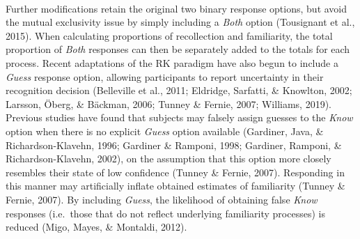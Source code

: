 \documentclass[
  11pt,
]{article}
\begin{document}
~

Further modifications retain the original two binary response options,
but avoid the mutual exclusivity issue by simply including a \emph{Both}
option (Tousignant et al., 2015). When calculating proportions of
recollection and familiarity, the total proportion of \emph{Both}
responses can then be separately added to the totals for each process.
Recent adaptations of the RK paradigm have also begun to include a
\emph{Guess} response option, allowing participants to report
uncertainty in their recognition decision (Belleville et al., 2011;
Eldridge, Sarfatti, \& Knowlton, 2002; Larsson, Öberg, \& Bäckman, 2006;
Tunney \& Fernie, 2007; Williams, 2019). Previous studies have found
that subjects may falsely assign guesses to the \emph{Know} option when
there is no explicit \emph{Guess} option available (Gardiner, Java, \&
Richardson-Klavehn, 1996; Gardiner \& Ramponi, 1998; Gardiner, Ramponi,
\& Richardson-Klavehn, 2002), on the assumption that this option more
closely resembles their state of low confidence (Tunney \& Fernie,
2007). Responding in this manner may artificially inflate obtained
estimates of familiarity (Tunney \& Fernie, 2007). By including
\emph{Guess}, the likelihood of obtaining false \emph{Know} responses
(i.e.~those that do not reflect underlying familiarity processes) is
reduced (Migo, Mayes, \& Montaldi, 2012).

~
\end{document}
